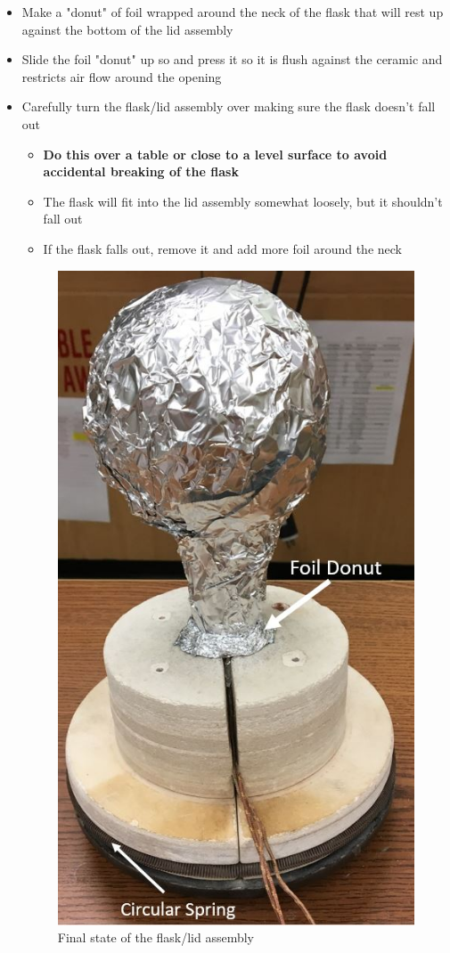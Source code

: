 \documentclass[letterpaper,11pt]{article}
\begin{document}
\begin{itemize}
\begin{itemize}
        
        \item Make a "donut" of foil wrapped around the neck of the flask that 
            will rest up against the bottom of the lid assembly
        \item Slide the foil "donut" up so and press it so it is flush against 
            the ceramic and restricts air flow around the opening
        \item Carefully turn the flask/lid assembly over making sure the flask 
            doesn't fall out
                \begin{itemize}
                \item \textbf{Do this over a table or close to a level surface 
                    to avoid accidental breaking of the flask}
                \item The flask will fit into the lid assembly somewhat loosely, 
                    but it shouldn't fall out
                \item If the flask falls out, remove it and add more foil 
                around the neck
                \end{itemize}
         
\begin{figure}[H]
\centering
\includegraphics[width=.45\textwidth]{insert_in_lid_w_donut.jpg}
\caption{Final state of the flask/lid assembly}
\label{fig:f_lid_done}
\end{figure}
        

\end{itemize}
\end{itemize}
\end{document}
